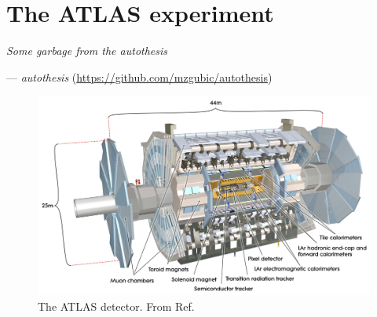 \chapter{The ATLAS experiment}

\textit{Some garbage from the autothesis}
\vspace{5mm}
\begin{flushright}
--- \textit{autothesis} (\url{https://github.com/mzgubic/autothesis})
\end{flushright}

\thispagestyle{empty}
\newpage

\begin{figure}[h]
  \centering
  \includegraphics[width=1\textwidth]{figures/experiment/atlas}
  \caption[The ATLAS detector.]{The ATLAS detector. From Ref. \cite{CERN:39038}}
   \label{fig:exp:atlas}
\end{figure}
